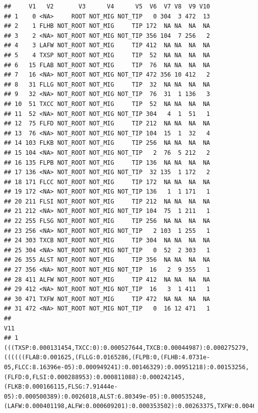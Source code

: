 \documentclass[]{article}
\begin{document}
\begin{verbatim}
##     V1   V2       V3      V4      V5  V6  V7 V8  V9 V10
## 1    0 <NA>     ROOT NOT_MIG NOT_TIP   0 304  3 472  13
## 2    1 FLHB NOT_ROOT NOT_MIG     TIP 172  NA NA  NA  NA
## 3    2 <NA> NOT_ROOT NOT_MIG NOT_TIP 356 104  7 256   2
## 4    3 LAFW NOT_ROOT NOT_MIG     TIP 412  NA NA  NA  NA
## 5    4 TXSP NOT_ROOT NOT_MIG     TIP  52  NA NA  NA  NA
## 6   15 FLAB NOT_ROOT NOT_MIG     TIP  76  NA NA  NA  NA
## 7   16 <NA> NOT_ROOT NOT_MIG NOT_TIP 472 356 10 412   2
## 8   31 FLLG NOT_ROOT NOT_MIG     TIP  32  NA NA  NA  NA
## 9   32 <NA> NOT_ROOT NOT_MIG NOT_TIP  76  31  1 136   3
## 10  51 TXCC NOT_ROOT NOT_MIG     TIP  52  NA NA  NA  NA
## 11  52 <NA> NOT_ROOT NOT_MIG NOT_TIP 304   4  1  51   1
## 12  75 FLFD NOT_ROOT NOT_MIG     TIP 212  NA NA  NA  NA
## 13  76 <NA> NOT_ROOT NOT_MIG NOT_TIP 104  15  1  32   4
## 14 103 FLKB NOT_ROOT NOT_MIG     TIP 256  NA NA  NA  NA
## 15 104 <NA> NOT_ROOT NOT_MIG NOT_TIP   2  76  5 212   2
## 16 135 FLPB NOT_ROOT NOT_MIG     TIP 136  NA NA  NA  NA
## 17 136 <NA> NOT_ROOT NOT_MIG NOT_TIP  32 135  1 172   2
## 18 171 FLCC NOT_ROOT NOT_MIG     TIP 172  NA NA  NA  NA
## 19 172 <NA> NOT_ROOT NOT_MIG NOT_TIP 136   1  1 171   1
## 20 211 FLSI NOT_ROOT NOT_MIG     TIP 212  NA NA  NA  NA
## 21 212 <NA> NOT_ROOT NOT_MIG NOT_TIP 104  75  1 211   1
## 22 255 FLSG NOT_ROOT NOT_MIG     TIP 256  NA NA  NA  NA
## 23 256 <NA> NOT_ROOT NOT_MIG NOT_TIP   2 103  1 255   1
## 24 303 TXCB NOT_ROOT NOT_MIG     TIP 304  NA NA  NA  NA
## 25 304 <NA> NOT_ROOT NOT_MIG NOT_TIP   0  52  2 303   1
## 26 355 ALST NOT_ROOT NOT_MIG     TIP 356  NA NA  NA  NA
## 27 356 <NA> NOT_ROOT NOT_MIG NOT_TIP  16   2  9 355   1
## 28 411 ALFW NOT_ROOT NOT_MIG     TIP 412  NA NA  NA  NA
## 29 412 <NA> NOT_ROOT NOT_MIG NOT_TIP  16   3  1 411   1
## 30 471 TXFW NOT_ROOT NOT_MIG     TIP 472  NA NA  NA  NA
## 31 472 <NA> NOT_ROOT NOT_MIG NOT_TIP   0  16 12 471   1
##                                                                                                                                                                                                                                                                                                                                                                                                                                           V11
## 1  (((TXSP:0.000131454,TXCC:0):0.000527644,TXCB:0.00044987):0.000275279,((((((FLAB:0.001625,(FLLG:0.0165286,(FLPB:0,(FLHB:4.0731e-05,FLCC:8.16396e-05):0.000949241):0.00146329):0.00951218):0.00153256,(FLFD:0,FLSI:0.000288953):0.000811088):0.000242145,(FLKB:0.000166115,FLSG:7.91444e-05):0.000500389):0.0026018,ALST:6.80349e-05):0.000535248,(LAFW:0.000401198,ALFW:0.000609201):0.000353502):0.00263375,TXFW:0.00468318):0.000275279);

\end{verbatim}
\end{document}
